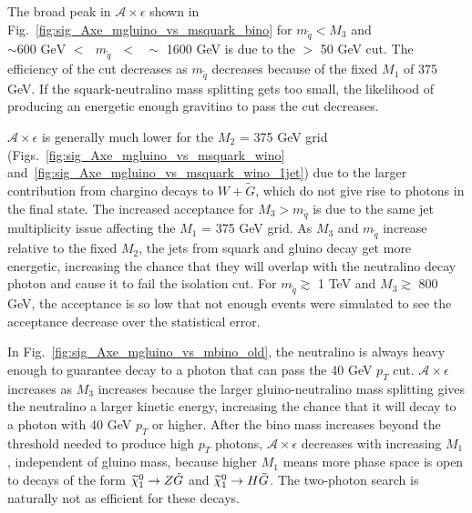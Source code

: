 \documentclass[dissertation.tex]{subfiles}
\begin{document}
The broad peak in $\mathcal{A}\times\epsilon$ shown in Fig.~\ref{fig:sig_Axe_mgluino_vs_msquark_bino} for $m_{\tilde{q}} < M_{3}$ and $\sim600\mbox{ GeV }<\mbox{ }m_{\tilde{q}}\mbox{ }<\mbox{ }\sim$ 1600 GeV is due to the \MET $>$ 50 GeV cut.  The efficiency of the cut decreases as $m_{\tilde{q}}$ decreases because of the fixed $M_{1}$ of 375 GeV.  If the squark-neutralino mass splitting gets too small, the likelihood of producing an energetic enough gravitino to pass the \MET cut decreases.

$\mathcal{A}\times\epsilon$ is generally much lower for the $M_{2}$ = 375 GeV grid (Figs.~\ref{fig:sig_Axe_mgluino_vs_msquark_wino} and~\ref{fig:sig_Axe_mgluino_vs_msquark_wino_1jet}) due to the larger contribution from chargino decays to $W + \tilde{G}$, which do not give rise to photons in the final state.  The increased acceptance for $M_{3} > m_{\tilde{q}}$ is due to the same jet multiplicity issue affecting the $M_{1}$ = 375 GeV grid.  As $M_{3}$ and $m_{\tilde{q}}$ increase relative to the fixed $M_{2}$, the jets from squark and gluino decay get more energetic, increasing the chance that they will overlap with the neutralino decay photon and cause it to fail the isolation cut.  For $m_{\tilde{q}} \gtrsim$ 1 TeV and $M_{3} \gtrsim$ 800 GeV, the acceptance is so low that not enough events were simulated to see the acceptance decrease over the statistical error.

In Fig.~\ref{fig:sig_Axe_mgluino_vs_mbino_old}, the neutralino is always heavy enough to guarantee decay to a photon that can pass the 40 GeV $p_{T}$ cut.  $\mathcal{A}\times\epsilon$ increases as $M_{3}$ increases because the larger gluino-neutralino mass splitting gives the neutralino a larger kinetic energy, increasing the chance that it will decay to a photon with 40 GeV $p_{T}$ or higher.  After the bino mass increases beyond the threshold needed to produce high $p_{T}$ photons, $\mathcal{A}\times\epsilon$ decreases with increasing $M_{1}$, independent of gluino mass, because higher $M_{1}$ means more phase space is open to decays of the form $\widetilde{\chi}_{1}^{0}\rightarrow Z\tilde{G}$ and $\widetilde{\chi}_{1}^{0}\rightarrow H\tilde{G}$.  The two-photon search is naturally not as efficient for these decays.

\end{document}
